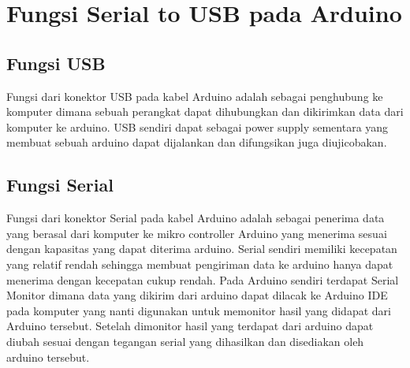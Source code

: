 \section{Fungsi Serial to USB pada Arduino}
\subsection{Fungsi USB}
Fungsi dari konektor USB pada kabel Arduino adalah sebagai penghubung ke komputer dimana sebuah perangkat dapat dihubungkan dan dikirimkan data dari komputer ke arduino. USB sendiri dapat sebagai power supply sementara yang membuat sebuah arduino dapat dijalankan dan difungsikan juga diujicobakan. 
\subsection{Fungsi Serial}
Fungsi dari konektor Serial pada kabel Arduino adalah sebagai penerima data yang berasal dari komputer ke mikro controller Arduino yang menerima sesuai dengan kapasitas yang dapat diterima arduino. Serial sendiri memiliki kecepatan yang relatif rendah sehingga membuat pengiriman data ke arduino hanya dapat menerima dengan kecepatan cukup rendah. Pada Arduino sendiri terdapat Serial Monitor dimana data yang dikirim dari arduino dapat dilacak ke Arduino IDE pada komputer yang nanti digunakan untuk memonitor hasil yang didapat dari Arduino tersebut. Setelah dimonitor hasil yang terdapat dari arduino dapat diubah sesuai dengan tegangan serial yang dihasilkan dan disediakan oleh arduino tersebut.


